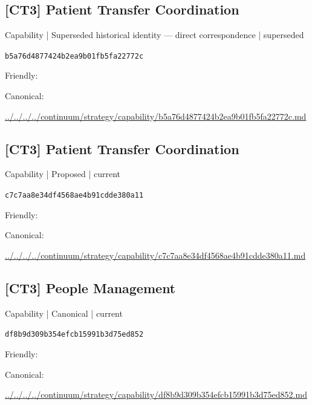 \documentclass[10pt,a4paper]{article}
\begin{document}
\subsection*{[CT3] Patient Transfer Coordination}
{\small Capability | Superseded historical identity — direct correspondence | superseded}\par
\texttt{b5a76d4877424b2ea9b01fb5fa22772c}\par
Friendly: \par
Canonical: \par
{\footnotesize\url{../../../../continuum/strategy/capability/b5a76d4877424b2ea9b01fb5fa22772c.md}}\par
\subsection*{[CT3] Patient Transfer Coordination}
{\small Capability | Proposed | current}\par
\texttt{c7c7aa8e34df4568ae4b91cdde380a11}\par
Friendly: \par
Canonical: \par
{\footnotesize\url{../../../../continuum/strategy/capability/c7c7aa8e34df4568ae4b91cdde380a11.md}}\par
\subsection*{[CT3] People Management}
{\small Capability | Canonical | current}\par
\texttt{df8b9d309b354efcb15991b3d75ed852}\par
Friendly: \par
Canonical: \par
{\footnotesize\url{../../../../continuum/strategy/capability/df8b9d309b354efcb15991b3d75ed852.md}}\par
\end{document}
